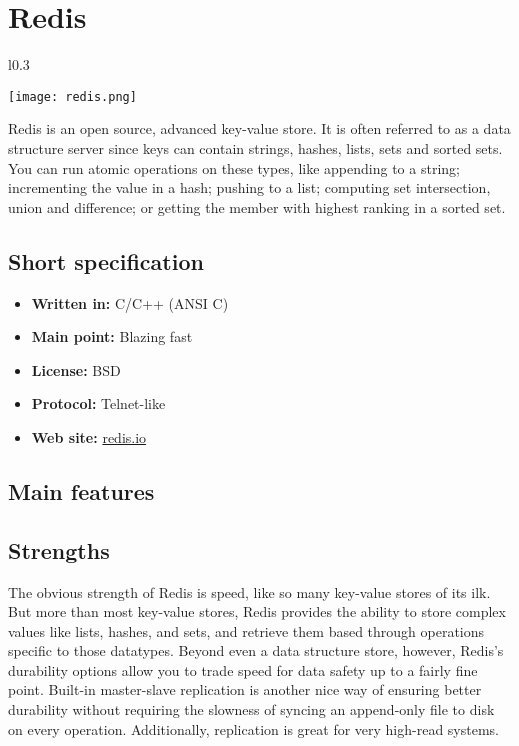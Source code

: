 \chapter{Redis}

\begin{wrapfigure}{l}{0.3\textwidth}
  \vspace{-80pt}
  \begin{center}
    \texttt{[image: redis.png]}
  \end{center}
  \vspace{-20pt}
\end{wrapfigure}
Redis is an open source, advanced key-value store. It is often referred to as a data structure server since keys can contain strings, hashes, lists, sets and sorted sets.
You can run atomic operations on these types, like appending to a string; incrementing the value in a hash; pushing to a list; computing set intersection, union and difference; or getting the member with highest ranking in a sorted set.

\section{Short specification}

\begin{itemize}
  \item \textbf{Written in:} C/C++ (ANSI C)
  \item \textbf{Main point:} Blazing fast
  \item \textbf{License:} BSD
  \item \textbf{Protocol:} Telnet-like
  \item \textbf{Web site:} \href{http://redis.io}{redis.io}
\end{itemize}

\section{Main features}

\section{Strengths}

The obvious strength of Redis is speed, like so many key-value stores of its ilk. But more than most key-value stores, Redis provides the ability to store complex values like lists, hashes, and sets, and retrieve them based through operations specific to those datatypes. Beyond even a data structure store, however, Redis's durability options allow you to trade speed for data safety up to a fairly fine point. Built-in master-slave replication is another nice way of ensuring better durability without requiring the slowness of syncing an append-only file to disk on every operation. Additionally, replication is great for very high-read systems.\cite{seven_databases}

